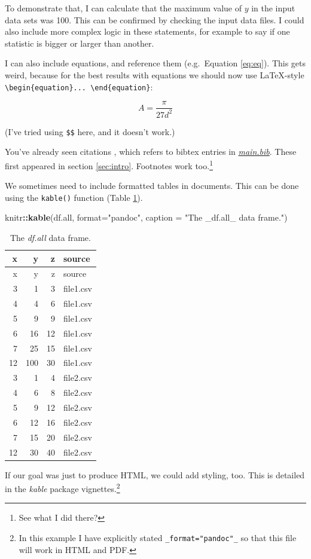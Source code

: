 \documentclass[11pt,]{article}
\newenvironment{Shaded}{\begin{snugshade}}{\end{snugshade}}
\newcommand{\DataTypeTok}[1]{\textcolor[rgb]{0.13,0.29,0.53}{#1}}
\newcommand{\KeywordTok}[1]{\textcolor[rgb]{0.13,0.29,0.53}{\textbf{#1}}}
\newcommand{\NormalTok}[1]{#1}
\newcommand{\OperatorTok}[1]{\textcolor[rgb]{0.81,0.36,0.00}{\textbf{#1}}}
\newcommand{\StringTok}[1]{\textcolor[rgb]{0.31,0.60,0.02}{#1}}
\let\rmarkdownfootnote\footnote%
\def\footnote{\protect\rmarkdownfootnote}
\begin{document}
To demonstrate that, I can calculate that the maximum value of \(y\) in the input data sets was 100. This can be confirmed by checking the input data files. I could also include more complex logic in these statements, for example to say if one statistic is bigger or larger than another.

I can also include equations, and reference them (e.g.~Equation \eqref{eq:eq}). This gets weird, because for the best results with equations we should now use LaTeX-style \texttt{\textbackslash{}begin\{equation\}...\ \textbackslash{}end\{equation\}}:

\[
\label{eq:eq}
A=\frac{\pi}{27d^2}
\]

(I've tried using \texttt{\$\$} here, and it doesn't work.)

You've already seen citations \citep{R-base}, which refers to bibtex entries in \href{main.bib}{\emph{main.bib}}. These first appeared in section \ref{sec:intro}. Footnotes work too.\footnote{See what I did there?}

We sometimes need to include formatted tables in documents. This can be done using the \texttt{kable()} function (Table \ref{tab:dfall}).

\begin{Shaded}
\begin{Highlighting}[]
\NormalTok{knitr}\OperatorTok{::}\KeywordTok{kable}\NormalTok{(df.all,}
  \DataTypeTok{format=}\StringTok{"pandoc"}\NormalTok{,}
  \DataTypeTok{caption =} \StringTok{"The _df.all_ data frame."}\NormalTok{)}
\end{Highlighting}
\end{Shaded}

\begin{longtable}[]{@{}rrrl@{}}
\caption{\label{tab:dfall}The \emph{df.all} data frame.}\tabularnewline
\toprule
x & y & z & source\tabularnewline
\midrule
\endfirsthead
\toprule
x & y & z & source\tabularnewline
\midrule
\endhead
3 & 1 & 3 & file1.csv\tabularnewline
4 & 4 & 6 & file1.csv\tabularnewline
5 & 9 & 9 & file1.csv\tabularnewline
6 & 16 & 12 & file1.csv\tabularnewline
7 & 25 & 15 & file1.csv\tabularnewline
12 & 100 & 30 & file1.csv\tabularnewline
3 & 1 & 4 & file2.csv\tabularnewline
4 & 6 & 8 & file2.csv\tabularnewline
5 & 9 & 12 & file2.csv\tabularnewline
6 & 12 & 16 & file2.csv\tabularnewline
7 & 15 & 20 & file2.csv\tabularnewline
12 & 30 & 40 & file2.csv\tabularnewline
\bottomrule
\end{longtable}

If our goal was just to produce HTML, we could add styling, too. This is detailed in the \emph{kable} package vignettes.\footnote{In this example I have explicitly stated \texttt{\_format="pandoc"\_} so that this file will work in HTML and PDF.}
\end{document}
